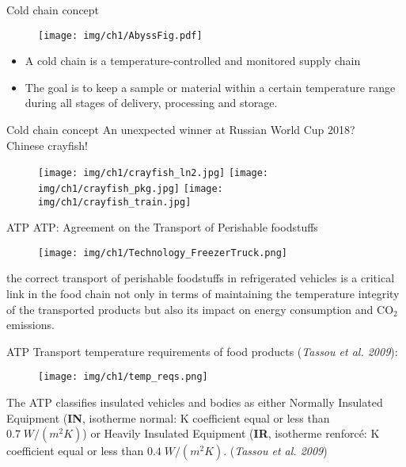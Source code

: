 
\begin{frame}{Cold chain concept}
    \begin{figure}[ht]
        \centering
        \texttt{[image: img/ch1/AbyssFig.pdf]}    
    \end{figure}
    \begin{itemize}
    \item A cold chain is a temperature-controlled and monitored supply chain
    \item The goal is to keep a sample or material within a certain temperature range during all stages of delivery, processing and storage.
    \end{itemize}
\end{frame}


\begin{frame}{Cold chain concept}
An unexpected winner at Russian World Cup 2018? \\
\pause  
\centering
\alert{Chinese crayfish!}
\vspace*{-6pt}
    \pause
    \begin{figure}[ht]
        \centering
        \texttt{[image: img/ch1/crayfish\_ln2.jpg]}
        \pause
        \texttt{[image: img/ch1/crayfish\_pkg.jpg]}
        \pause
        \texttt{[image: img/ch1/crayfish\_train.jpg]}
    \end{figure}

\end{frame}


\begin{frame}{ATP}
    ATP: Agreement on the Transport of Perishable foodstuffs
    \begin{figure}
        \centering
        \texttt{[image: img/ch1/Technology\_FreezerTruck.png]}
    \end{figure}
    \small{the correct transport of perishable foodstuffs in refrigerated vehicles is a critical link in the food chain not only in terms of maintaining the temperature integrity of the transported products but also its impact on energy consumption and CO$_2$ emissions. }
\end{frame}


\begin{frame}{ATP}
\small{Transport temperature requirements of food products (\textit{Tassou et al. 2009}):}
    \begin{figure}
        \centering
        \texttt{[image: img/ch1/temp\_reqs.png]}
    \end{figure}
    \scriptsize{The ATP classifies insulated vehicles and bodies as either Normally Insulated Equipment (\textbf{IN}, isotherme normal: K coefficient equal or less than $ 0.7\; W/(m^2 K) $) or Heavily Insulated Equipment (\textbf{IR}, isotherme renforcé: K coefficient equal or less than $ 0.4\; W/(m^2 K )$. (\textit{Tassou et al. 2009})}
\end{frame}


